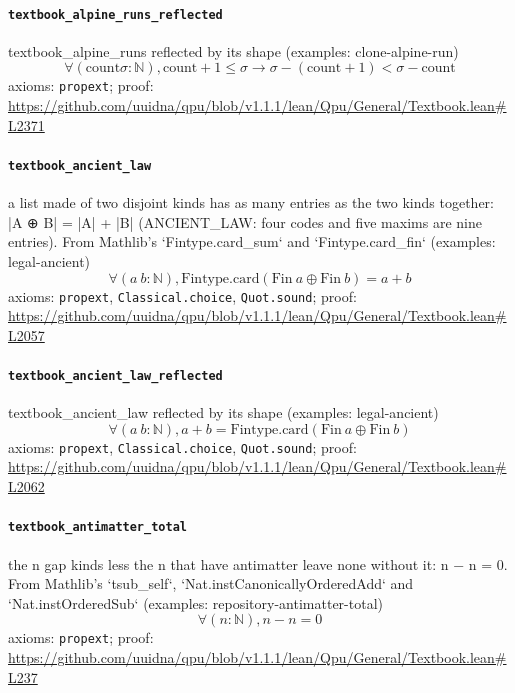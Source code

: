 \documentclass[11pt]{article}
\begin{document}
\paragraph{\texttt{textbook\_alpine\_runs\_reflected}}
textbook\_alpine\_runs reflected by its shape (examples: clone-alpine-run)
\[ \forall (\mathrm{count} \sigma : \mathbb{N}), \mathrm{count} + 1 \le \sigma \to \sigma - (\mathrm{count} + 1) < \sigma - \mathrm{count} \]
\noindent axioms: \texttt{propext}; proof: \url{https://github.com/uuidna/qpu/blob/v1.1.1/lean/Qpu/General/Textbook.lean\#L2371}

\paragraph{\texttt{textbook\_ancient\_law}}
a list made of two disjoint kinds has as many entries as the two kinds together: |A ⊕ B| = |A| + |B| (ANCIENT\_LAW: four codes and five maxims are nine entries). From Mathlib's `Fintype.card\_sum` and `Fintype.card\_fin` (examples: legal-ancient)
\[ \forall (a\ b : \mathbb{N}), \mathrm{Fintype.card} (\mathrm{Fin}\ a \oplus \mathrm{Fin}\ b) = a + b \]
\noindent axioms: \texttt{propext}, \texttt{Classical.choice}, \texttt{Quot.sound}; proof: \url{https://github.com/uuidna/qpu/blob/v1.1.1/lean/Qpu/General/Textbook.lean\#L2057}

\paragraph{\texttt{textbook\_ancient\_law\_reflected}}
textbook\_ancient\_law reflected by its shape (examples: legal-ancient)
\[ \forall (a\ b : \mathbb{N}), a + b = \mathrm{Fintype.card} (\mathrm{Fin}\ a \oplus \mathrm{Fin}\ b) \]
\noindent axioms: \texttt{propext}, \texttt{Classical.choice}, \texttt{Quot.sound}; proof: \url{https://github.com/uuidna/qpu/blob/v1.1.1/lean/Qpu/General/Textbook.lean\#L2062}

\paragraph{\texttt{textbook\_antimatter\_total}}
the n gap kinds less the n that have antimatter leave none without it: n − n = 0. From Mathlib's `tsub\_self`, `Nat.instCanonicallyOrderedAdd` and `Nat.instOrderedSub` (examples: repository-antimatter-total)
\[ \forall (n : \mathbb{N}), n - n = 0 \]
\noindent axioms: \texttt{propext}; proof: \url{https://github.com/uuidna/qpu/blob/v1.1.1/lean/Qpu/General/Textbook.lean\#L237}
\end{document}
